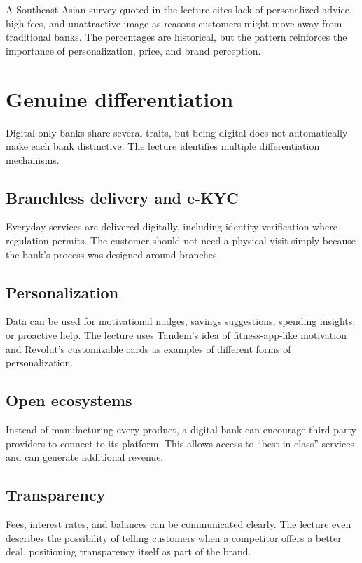 A Southeast Asian survey quoted in the lecture cites lack of personalized advice, high fees, and unattractive image as reasons customers might move away from traditional banks. The percentages are historical, but the pattern reinforces the importance of personalization, price, and brand perception.

\section{Genuine differentiation}

Digital-only banks share several traits, but being digital does not automatically make each bank distinctive. The lecture identifies multiple differentiation mechanisms.

\subsection{Branchless delivery and e-KYC}

Everyday services are delivered digitally, including identity verification where regulation permits. The customer should not need a physical visit simply because the bank's process was designed around branches.

\subsection{Personalization}

Data can be used for motivational nudges, savings suggestions, spending insights, or proactive help. The lecture uses Tandem's idea of fitness-app-like motivation and Revolut's customizable cards as examples of different forms of personalization.

\subsection{Open ecosystems}

Instead of manufacturing every product, a digital bank can encourage third-party providers to connect to its platform. This allows access to ``best in class'' services and can generate additional revenue.

\subsection{Transparency}

Fees, interest rates, and balances can be communicated clearly. The lecture even describes the possibility of telling customers when a competitor offers a better deal, positioning transparency itself as part of the brand.

